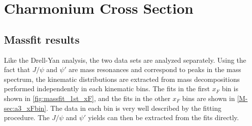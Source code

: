 \documentclass[../main.tex]{subfiles}
\begin{document}
\ifSubfilesClassLoaded{
	\mainmatter
	\setcounter{chapter}{6}
	\setcounter{section}{1}
}{}

\section{Charmonium Cross Section}

\subsection{Massfit results}
Like the Drell-Yan analysis, the two data sets are analyzed separately.
Using the fact that $J/\psi$ and $\psi'$ are mass resonances and correspond to peaks in the mass spectrum,
the kinematic distributions are extracted from mass decompositions performed independently in each kinematic bins.
The fits in the first $x_F$ bin is shown in \cref{fig:massfit_1st_xF},
and the fits in the other $x_F$ bins are shown in \cref{M-sec:a3_xFbin}.
The data in each bin is very well described by the fitting procedure.
The $J/\psi$ and $\psi'$ yields can then be extracted from the fits directly.
\end{document}
